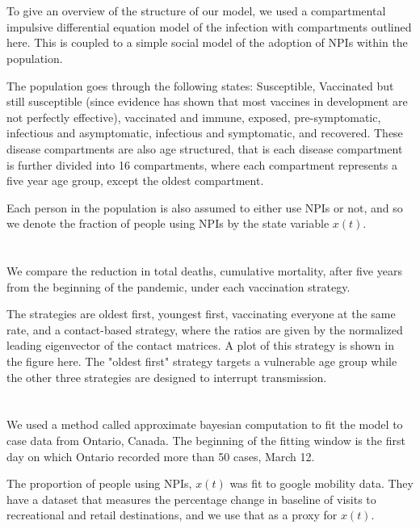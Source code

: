 \documentclass{article}
\begin{document}
\section{}
To give an overview of the structure of our model, we used a compartmental impulsive differential equation model of the infection with compartments outlined here. This is coupled to a simple social model of the adoption of NPIs within the population.

The population goes through the following states: Susceptible, Vaccinated but still susceptible (since evidence has shown that most vaccines in development are not perfectly effective), vaccinated and immune, exposed, pre-symptomatic, infectious and asymptomatic, infectious and symptomatic, and recovered. These disease compartments are also age structured, that is each disease compartment is further divided into 16 compartments, where each compartment represents a five year age group, except the oldest compartment.

Each person in the population is also assumed to either use NPIs or not, and so we denote the fraction of people using NPIs by the state variable $x(t)$.


\section{}

We compare the reduction in total deaths, cumulative mortality, after five years from the beginning of the pandemic, under each vaccination strategy.

The strategies are oldest first, youngest first, vaccinating everyone at the same rate, and a contact-based strategy, where the ratios are given by the normalized leading eigenvector of the contact matrices. A plot of this strategy is shown in the figure here. The "oldest first" strategy targets a vulnerable age group while the other three strategies are designed to interrupt transmission.


\section{}
We used a method called approximate bayesian computation to fit the model to case data from Ontario, Canada. The beginning of the fitting window is the first day on which Ontario recorded more than 50 cases, March 12.

The proportion of people using NPIs, $x(t)$ was fit to google mobility data. They have a dataset that measures the percentage change in baseline of visits to recreational and retail destinations, and we use that as a proxy for $x(t)$.
\end{document}
